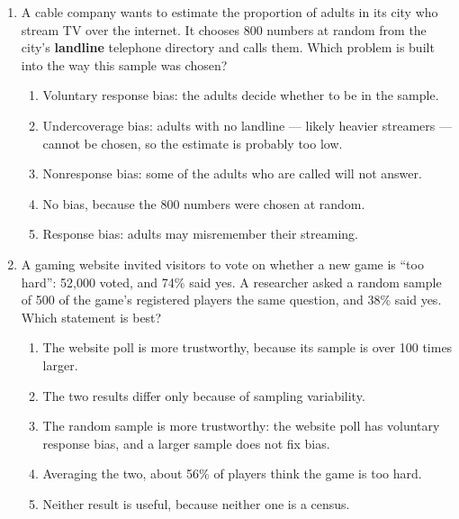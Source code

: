 \documentclass[12pt]{article}
\begin{document}
\begin{enumerate}[leftmargin=1.9em, itemsep=0.13in]
  \boxguard[14]
  \item A cable company wants to estimate the proportion of adults in its city who stream TV
        over the internet. It chooses 800 numbers at random from the city's \textbf{landline}
        telephone directory and calls them. Which problem is built into the way this sample was
        chosen?
        \begin{enumerate}[label=\textbf{(\Alph*)}, leftmargin=2.2em, itemsep=2pt]
          \item Voluntary response bias: the adults decide whether to be in the sample.
          \item Undercoverage bias: adults with no landline --- likely heavier streamers ---
                cannot be chosen, so the estimate is probably too low.
          \item Nonresponse bias: some of the adults who are called will not answer.
          \item No bias, because the 800 numbers were chosen at random.
          \item Response bias: adults may misremember their streaming.\hfill{}\rule[-0.2in]{0pt}{0.48in}
        \end{enumerate}

  \boxguard[14]
  \item A gaming website invited visitors to vote on whether a new game is ``too hard'':
        52{,}000 voted, and 74\% said yes. A researcher asked a random sample of 500 of the
        game's registered players the same question, and 38\% said yes. Which statement is
        best?
        \begin{enumerate}[label=\textbf{(\Alph*)}, leftmargin=2.2em, itemsep=2pt]
          \item The website poll is more trustworthy, because its sample is over 100 times larger.
          \item The two results differ only because of sampling variability.
          \item The random sample is more trustworthy: the website poll has voluntary response
                bias, and a larger sample does not fix bias.
          \item Averaging the two, about 56\% of players think the game is too hard.
          \item Neither result is useful, because neither one is a census.\hfill{}\rule[-0.2in]{0pt}{0.48in}
        \end{enumerate}


\end{enumerate}
\end{document}
